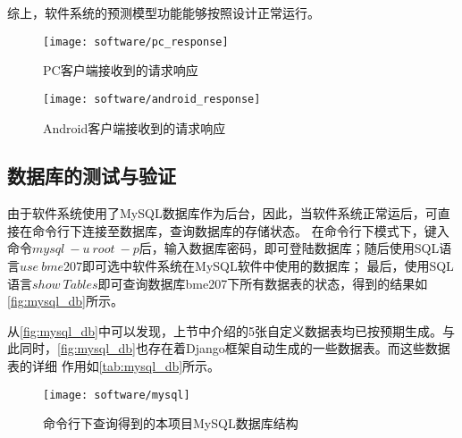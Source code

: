 综上，软件系统的预测模型功能能够按照设计正常运行。

\begin{figure}[htbp]
    \centering
    \texttt{[image: software/pc\_response]}
    \caption{\label{fig:pc_response}PC客户端接收到的请求响应}
\end{figure}
\begin{figure}[htbp]
    \centering
    \texttt{[image: software/android\_response]}
    \caption{\label{fig:android_response}Android客户端接收到的请求响应}
\end{figure}
\subsection{数据库的测试与验证}
由于软件系统使用了MySQL数据库作为后台，因此，当软件系统正常运后，可直接在命令行下连接至数据库，查询数据库的存储状态。
在命令行下模式下，键入命令$mysql\ -u\ root\ -p$后，输入数据库密码，即可登陆数据库；随后使用SQL语言$use\ bme207$即可选中软件系统在MySQL软件中使用的数据库；
最后，使用SQL语言$show\ Tables$即可查询数据库bme207下所有数据表的状态，得到的结果如\autoref{fig:mysql_db}所示。

从\autoref{fig:mysql_db}中可以发现，上节中介绍的5张自定义数据表均已按预期生成。与此同时，\autoref{fig:mysql_db}也存在着Django框架自动生成的一些数据表。而这些数据表的详细
作用如\autoref{tab:mysql_db}所示。

\begin{figure}[htbp]
    \centering
    \texttt{[image: software/mysql]}
    \caption{\label{fig:mysql_db}命令行下查询得到的本项目MySQL数据库结构}
\end{figure}

